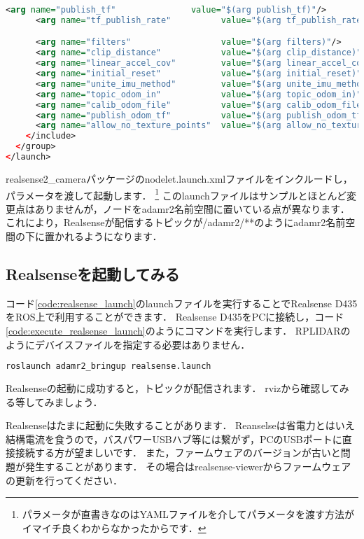 \documentclass[{../../master}]{subfiles}
\begin{document}
\begin{lstlisting}[language=XML, label=code:realsense_launch, caption=\textsf{realsense.launch}]
      <arg name="publish_tf"               value="$(arg publish_tf)"/>
      <arg name="tf_publish_rate"          value="$(arg tf_publish_rate)"/>

      <arg name="filters"                  value="$(arg filters)"/>
      <arg name="clip_distance"            value="$(arg clip_distance)"/>
      <arg name="linear_accel_cov"         value="$(arg linear_accel_cov)"/>
      <arg name="initial_reset"            value="$(arg initial_reset)"/>
      <arg name="unite_imu_method"         value="$(arg unite_imu_method)"/>
      <arg name="topic_odom_in"            value="$(arg topic_odom_in)"/>
      <arg name="calib_odom_file"          value="$(arg calib_odom_file)"/>
      <arg name="publish_odom_tf"          value="$(arg publish_odom_tf)"/>
      <arg name="allow_no_texture_points"  value="$(arg allow_no_texture_points)"/>
    </include>
  </group>
</launch>
\end{lstlisting}

\textsf{realsense2\_camera}パッケージの\textsf{nodelet.launch.xml}ファイルをインクルードし，パラメータを渡して起動します．
\footnote{パラメータが直書きなのはYAMLファイルを介してパラメータを渡す方法がイマイチ良くわからなかったからです．}
このlaunchファイルはサンプルとほとんど変更点はありませんが，ノードを\textsf{adamr2}名前空間に置いている点が異なります．
これにより，Realsenseが配信するトピックが\textsf{/adamr2/**}のように\textsf{adamr2}名前空間の下に置かれるようになります．

\subsection{Realsenseを起動してみる}

コード\ref{code:realsense_launch}のlaunchファイルを実行することでRealsense D435をROS上で利用することができます．
Realsense D435をPCに接続し，コード\ref{code:execute_realsense_launch}のようにコマンドを実行します．
RPLIDARのようにデバイスファイルを指定する必要はありません．

\begin{lstlisting}[language=sh, label=code:execute_realsense_launch, caption=Launch \textsf{realsense.launch}]
roslaunch adamr2_bringup realsense.launch
\end{lstlisting}

Realsenseの起動に成功すると，トピックが配信されます．
\textsf{rviz}から確認してみる等してみましょう．

Realsenseはたまに起動に失敗することがあります．
Reanselseは省電力とはいえ結構電流を食うので，バスパワーUSBハブ等には繋がず，PCのUSBポートに直接接続する方が望ましいです．
また，ファームウェアのバージョンが古いと問題が発生することがあります．
その場合は\textsf{realsense-viewer}からファームウェアの更新を行ってください．
\end{document}

